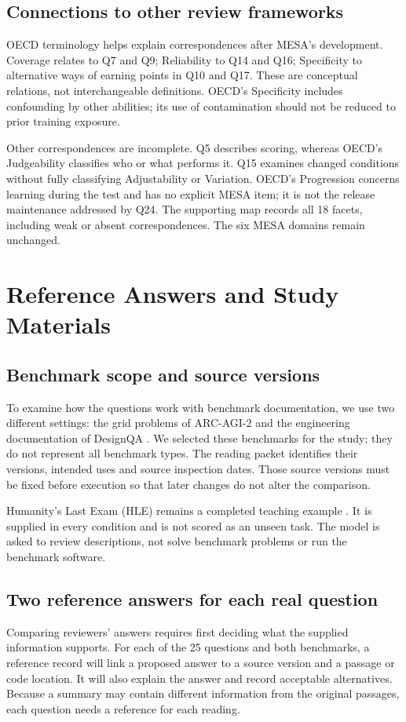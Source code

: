 \documentclass[10pt,conference]{IEEEtran}
\begin{document}
\subsection{Connections to other review frameworks}
OECD terminology helps explain correspondences after MESA's development. Coverage relates to Q7 and Q9; Reliability to Q14 and Q16; Specificity to alternative ways of earning points in Q10 and Q17. These are conceptual relations, not interchangeable definitions. OECD's Specificity includes confounding by other abilities; its use of contamination should not be reduced to prior training exposure.

Other correspondences are incomplete. Q5 describes scoring, whereas OECD's Judgeability classifies who or what performs it. Q15 examines changed conditions without fully classifying Adjustability or Variation. OECD's Progression concerns learning during the test and has no explicit MESA item; it is not the release maintenance addressed by Q24. The supporting map records all 18 facets, including weak or absent correspondences. The six MESA domains remain unchanged.

\section{Reference Answers and Study Materials}
\subsection{Benchmark scope and source versions}
To examine how the questions work with benchmark documentation, we use two different settings: the grid problems of ARC-AGI-2 and the engineering documentation of DesignQA \cite{chollet_arc_agi_2_2025,doris_designqa_2024}. We selected these benchmarks for the study; they do not represent all benchmark types. The reading packet identifies their versions, intended uses and source inspection dates. Those source versions must be fixed before execution so that later changes do not alter the comparison.

Humanity's Last Exam (HLE) remains a completed teaching example \cite{phan_etal_hle_2025}. It is supplied in every condition and is not scored as an unseen task. The model is asked to review descriptions, not solve benchmark problems or run the benchmark software.

\subsection{Two reference answers for each real question}
Comparing reviewers' answers requires first deciding what the supplied information supports. For each of the 25 questions and both benchmarks, a reference record will link a proposed answer to a source version and a passage or code location. It will also explain the answer and record acceptable alternatives. Because a summary may contain different information from the original passages, each question needs a reference for each reading.
\end{document}
